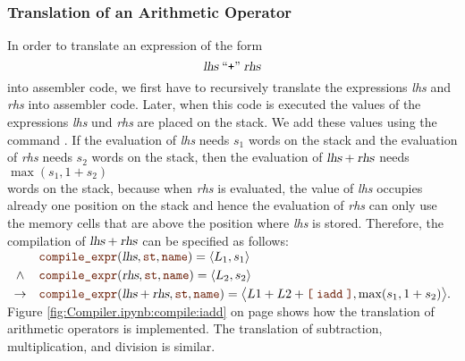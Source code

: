 \subsubsection{Translation of an Arithmetic Operator}
In order to translate an expression of the form
\[ \textsl{lhs} \;\mbox{``\texttt{+}''}\; \textsl{rhs} \]
into assembler code, we first have to recursively translate the expressions \textsl{lhs} and
\textsl{rhs} into assembler code.  Later, when this code is executed the values of the expressions
\textsl{lhs} und \textsl{rhs} are placed on the stack.  We add these values using the command .
If the evaluation of \textsl{lhs} needs $s_1$ words on the stack and the evaluation of \textsl{rhs} needs $s_2$
words on the stack, then the evaluation of $\textsl{lhs} + \textsl{rhs}$ needs 
\\[0.2cm]
\hspace*{1.3cm}
$\max(s_1, 1 + s_2)$
\\[0.2cm]
words on the stack, because when \textsl{rhs} is evaluated, the value of \textsl{lhs} occupies already one position
on the stack and hence the evaluation of \textsl{rhs} can only use the memory cells that are above the position
where \textsl{lhs} is stored. Therefore, the compilation of $\textsl{lhs} + \textsl{rhs}$ can be specified as
follows:
\\[0.2cm]
\hspace*{1.3cm}
$
\begin{array}[t]{cll}
        & \mytt{compile\_expr}(\textsl{lhs}, \mytt{st}, \mytt{name}) = \pair(L_1, s_1)  \\[0.1cm]
\wedge  & \mytt{compile\_expr}(\textsl{rhs}, \mytt{st}, \mytt{name}) = \pair(L_2, s_2)  \\[0.1cm]
\rightarrow & \mytt{compile\_expr}(\textsl{lhs} + \textsl{rhs}, \mytt{st}, \mytt{name}) = 
            \bigl\langle L1 + L2 + \mytt{[}\; \mytt{iadd} \;\mytt{]}, \max(s_1, 1+s_2) \bigr\rangle.
\end{array}$
\\[0.2cm]
Figure \ref{fig:Compiler.ipynb:compile:iadd} on page \pageref{fig:Compiler.ipynb:compile:iadd} shows how the
translation of arithmetic operators is implemented.  The translation of subtraction, multiplication, and
division is similar.

